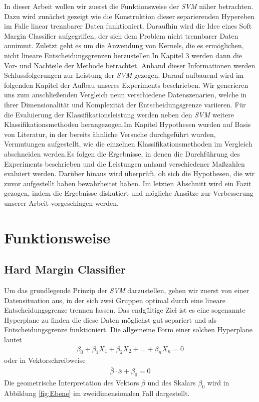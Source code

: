 \documentclass[
]{article}
\begin{document}
In dieser Arbeit wollen wir zuerst die Funktionsweise der \textit{SVM}
näher betrachten. Dazu wird zunächst gezeigt wie die Konstruktion dieser
separierenden Hypereben im Falle linear trennbarer Daten funktioniert.
Daraufhin wird die Idee eines Soft Margin Classifier aufgegriffen, der
sich dem Problem nicht trennbarer Daten annimmt. Zuletzt geht es um die
Anwendung von Kernels, die es ermöglichen, nicht lineare
Entscheidungsgrenzen herzustellen.\newline In Kapitel 3 werden dann die
Vor- und Nachteile der Methode betrachtet. Anhand dieser Informationen
werden Schlussfolgerungen zur Leistung der \textit{SVM} gezogen. Darauf
aufbauend wird im folgenden Kapitel der Aufbau unseres Experiments
beschrieben. Wir generieren uns zum anschließenden Vergleich neun
verschiedene Datenszenarien, welche in ihrer Dimensionalität und
Komplexität der Entscheidungsgrenze variieren. Für die Evaluierung der
Klassifikationsleistung werden neben den \textit{SVM} weitere
Klassifikationsmethoden herangezogen.\newline Im Kapitel Hypothesen
wurden auf Basis von Literatur, in der bereits ähnliche Versuche
durchgeführt wurden, Vermutungen aufgestellt, wie die einzelnen
Klassifikationsmethoden im Vergleich abschneiden werden.\newline Es
folgen die Ergebnisse, in denen die Durchführung des Experiments
beschrieben und die Leistungen anhand verschiedener Maßzahlen evaluiert
werden. Darüber hinaus wird überprüft, ob sich die Hypothesen, die wir
zuvor aufgestellt haben bewahrheitet haben. Im letzten Abschnitt wird
ein Fazit gezogen, indem die Ergebnisse diskutiert und mögliche Ansätze
zur Verbesserung unserer Arbeit vorgeschlagen werden.

\section{Funktionsweise}

\subsection{Hard Margin Classifier}

Um das grundlegende Prinzip der \textit{SVM} darzustellen, gehen wir
zuerst von einer Datensituation aus, in der sich zwei Gruppen optimal
durch eine lineare Entscheidungsgrenze trennen lassen. Das endgültige
Ziel ist es eine sogenannte Hyperplane zu finden die diese Daten
möglichst gut separiert und als Entscheidungsgrenze funktioniert. Die
allgemeine Form einer solchen Hyperplane lautet \begin{align}
\beta_0+ \beta_1 X_1+\beta_2 X_2+...+\beta_n X_n=0\label{eq:hyperebene}
\end{align} oder in Vektorschreibweise \begin{align}
\overline{\beta}\cdot\overline{x}+\beta_0=0 \label{eq:hyperplanevec}
\end{align} Die geometrische Interpretation des Vektors
\(\overline{\beta}\) und des Skalars \(\beta_0\) wird in Abbildung
\ref{fig:Ebene} im zweidimensionalen Fall dargestellt.
\end{document}
